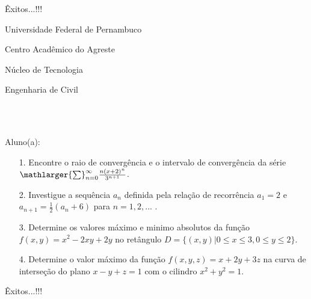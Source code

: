\documentclass[oneside,a4paper,12pt]{article}
\newcommand{\universidade}{Universidade Federal de Pernambuco}
\newcommand{\centro}{Centro Acadêmico do Agreste}
\newcommand{\departamento}{Núcleo de Tecnologia}
\newcommand{\curso}{Engenharia de Civil}
\begin{document}
	\flushbottom
	\flushright
     Êxitos...!!!
     \begin{center}
     	\vspace{0pt}
     	
     	\universidade
     	\par
     	\centro
     	\par
     	\departamento
     	\par
     	\curso
     	\par
     	\vspace{08pt}
     	\\ \\
     \end{center}
     
     \begin{flushleft}
     	Aluno(a):
     \end{flushleft}
 
 \begin{itemize}
 	\item[1.]  Encontre o raio de convergência e o intervalo de convergência da série $\mathlarger{\sum}_{n=0}^{\infty} \frac{n(x+2)^{n}}{3^{n+1}}$.
 \end{itemize}
 \begin{itemize}
 	\item[2.] Investigue a sequência ${a_{n}}$ definida pela relação de recorrência $a_{1}=2$ e $a_{n+1}=\frac{1}{2}(a_{n}+6)$ para $n=1,2,...$  . 
 \end{itemize}
 \begin{itemize}
 	\item [3.] Determine os valores máximo e minimo absolutos da função $f(x,y)=x^{2}-2xy+2y$ no retângulo $D=\{(x,y)| 0\leq x \leq 3, 0\leq y \leq 2\}$.
 \end{itemize}
 \begin{itemize}
 	\item[4.] Determine o valor máximo da função $f(x,y,z)=x+2y+3z$ na curva de interseção do plano $x-y+z=1$ com o cilindro $x^{2}+y^{2}=1$.
 \end{itemize}
\flushbottom
\flushright
Êxitos...!!!
\end{document}
